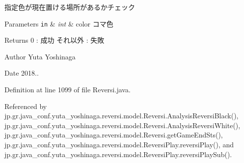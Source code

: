 指定色が現在置ける場所があるかチェック 


\begin{DoxyParams}[1]{Parameters}
\mbox{\tt in}  & {\em int} & color コマ色 \\
\hline
\end{DoxyParams}
\begin{DoxyReturn}{Returns}
0 \+: 成功 それ以外 \+: 失敗 
\end{DoxyReturn}
\begin{DoxyAuthor}{Author}
Yuta Yoshinaga 
\end{DoxyAuthor}
\begin{DoxyDate}{Date}
2018.. 
\end{DoxyDate}


Definition at line 1099 of file Reversi.\+java.



Referenced by jp.\+gr.\+java\+\_\+conf.\+yuta\+\_\+yoshinaga.\+reversi.\+model.\+Reversi.\+Analysis\+Reversi\+Black(), jp.\+gr.\+java\+\_\+conf.\+yuta\+\_\+yoshinaga.\+reversi.\+model.\+Reversi.\+Analysis\+Reversi\+White(), jp.\+gr.\+java\+\_\+conf.\+yuta\+\_\+yoshinaga.\+reversi.\+model.\+Reversi.\+get\+Game\+End\+Sts(), jp.\+gr.\+java\+\_\+conf.\+yuta\+\_\+yoshinaga.\+reversi.\+model.\+Reversi\+Play.\+reversi\+Play(), and jp.\+gr.\+java\+\_\+conf.\+yuta\+\_\+yoshinaga.\+reversi.\+model.\+Reversi\+Play.\+reversi\+Play\+Sub().

